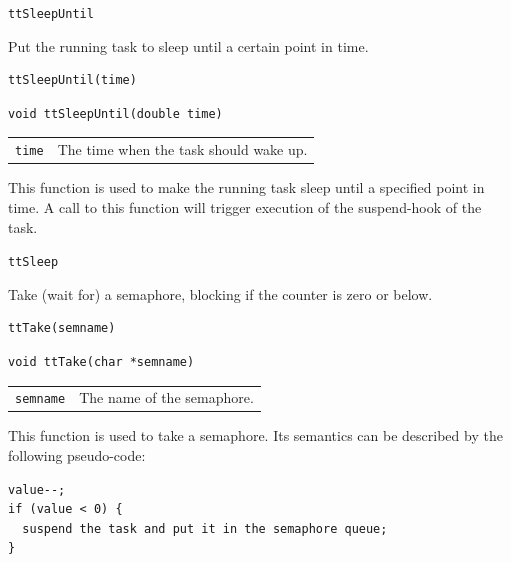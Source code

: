 \documentclass[final,twoside]{rapport}
\begin{document}
\seealso
{\tt ttSleepUntil}



\purpose
Put the running task to sleep until a certain point in time.

\Msyntax
\begin{verbatim}
ttSleepUntil(time)
\end{verbatim}

\Csyntax
\begin{verbatim}
void ttSleepUntil(double time)
\end{verbatim}

\args
\begin{tabularx}{\hsize}{l>{\raggedright\arraybackslash}X}
  {\tt time} & The time when the task should wake up. \\
\end{tabularx}

\descr This function is used to make the running task sleep until a
specified point in time. A call to this function will trigger
execution of the suspend-hook of the task.

\seealso
{\tt ttSleep}



\purpose
Take (wait for) a semaphore, blocking if the counter is zero or below.

\Msyntax
\begin{verbatim}
ttTake(semname)
\end{verbatim}

\Csyntax
\begin{verbatim}
void ttTake(char *semname)
\end{verbatim}

\args
\begin{tabularx}{\hsize}{l>{\raggedright\arraybackslash}X}
  {\tt semname} & The name of the semaphore.\\
\end{tabularx}

\descr This function is used to take a semaphore. Its semantics can
be described by the following pseudo-code:
\begin{verbatim}
value--;
if (value < 0) {
  suspend the task and put it in the semaphore queue;
}
\end{verbatim}

\example
\end{document}
